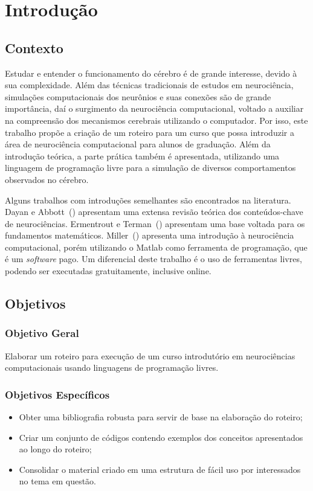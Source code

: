 \chapter{Introdução}\label{cap:introducao}
\section{Contexto}
Estudar e entender o funcionamento do cérebro é de grande interesse, devido à sua complexidade. Além das técnicas tradicionais de estudos em neurociência, simulações computacionais dos neurônios e suas conexões são de grande importância, daí o surgimento da neurociência computacional, voltado a auxiliar na compreensão dos mecanismos cerebrais utilizando o computador. Por isso, este trabalho propõe a criação de um roteiro para um curso que possa introduzir a área de neurociência computacional para alunos de graduação. Além da introdução teórica, a parte prática também é apresentada, utilizando uma linguagem de programação livre para a simulação de diversos comportamentos observados no cérebro.

Alguns trabalhos com introduções semelhantes são encontrados na literatura. Dayan e Abbott~(\citeyear{dayan_theoretical_2001}) apresentam uma extensa revisão teórica dos conteúdos-chave de neurociências. Ermentrout e Terman~(\citeyear{ermentrout_mathematical_2010}) apresentam uma base voltada para os fundamentos matemáticos. Miller~(\citeyear{miller_introductory_2018}) apresenta uma introdução à neurociência computacional, porém utilizando o Matlab como ferramenta de programação, que é um \textit{software} pago. Um diferencial deste trabalho é o uso de ferramentas livres, podendo ser executadas gratuitamente, inclusive online.

\section{Objetivos}
\subsection{Objetivo Geral}
Elaborar um roteiro para execução de um curso introdutório em neurociências computacionais usando linguagens de programação livres.

\subsection{Objetivos Específicos}
\begin{itemize}
\item Obter uma bibliografia robusta para servir de base na elaboração do roteiro;
\item Criar um conjunto de códigos contendo exemplos dos conceitos apresentados ao longo do roteiro;
\item Consolidar o material criado em uma estrutura de fácil uso por interessados no tema em questão.
\end{itemize}

